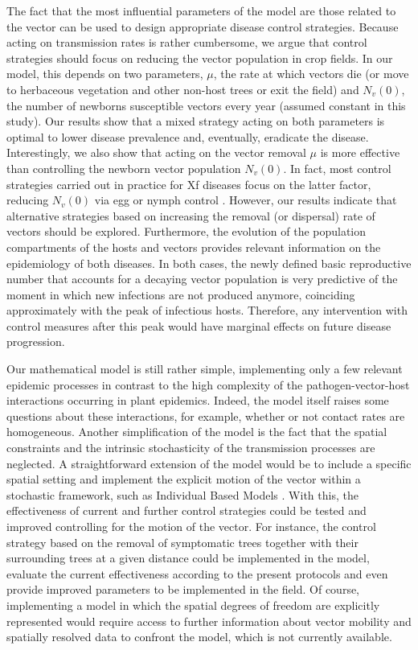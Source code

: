 The fact that the most influential parameters of the model are those
related to the vector can be used to design appropriate disease control
strategies. Because acting on transmission rates is rather cumbersome, we argue
that control strategies should focus on reducing the vector population in crop
fields. In our model, this depends on two parameters, $\mu$, the rate at which
vectors die (or move to herbaceous vegetation and other non-host trees or exit
the field) and $N_v(0)$, the number of newborns susceptible vectors every year
(assumed constant in this study). Our results show that a mixed strategy acting
on both parameters is optimal to lower disease prevalence and, eventually,
eradicate the disease. Interestingly, we also show that acting on the vector
removal $\mu$ is more effective than controlling the newborn vector population
$N_v(0)$. In fact, most control strategies carried out in practice for Xf
diseases focus on the latter factor, reducing $N_v(0)$ via egg or nymph control
\cite{Cornara2018, lopez2022mechanical, Lago2022}. However, our results
indicate that alternative strategies based on increasing the removal (or
dispersal) rate of vectors should be explored. Furthermore, the evolution of
the population compartments of the hosts and vectors provides relevant
information on the epidemiology of both diseases. In both cases, the newly
defined basic reproductive number that accounts for a decaying vector
population is very predictive of the moment in which new infections are not
produced anymore, coinciding approximately with the peak of infectious hosts.
Therefore, any intervention with control measures after this peak would have
marginal effects on future disease progression.

Our mathematical model is still rather simple, implementing only a few
relevant epidemic processes in contrast to the high complexity of the
pathogen-vector-host interactions occurring in plant epidemics. Indeed, the
model itself raises some questions about these interactions, for example,
whether or not contact rates are homogeneous. Another simplification of the
model is the fact that the spatial constraints and the intrinsic stochasticity
of the transmission processes are neglected. A straightforward extension of the
model would be to include a specific spatial setting and implement the explicit
motion of the vector within a stochastic framework, such as Individual Based
Models \cite{Grimm2005}. With this, the effectiveness of current and further
control strategies could be tested and improved controlling for the motion of
the vector. For instance, the control strategy based on the removal of
symptomatic trees together with their surrounding trees at a given distance
could be implemented in the model, evaluate the current effectiveness according
to the present protocols and even provide improved parameters to be implemented
in the field. Of course, implementing a model in which the spatial degrees of
freedom are explicitly represented would require access to further information
about vector mobility and spatially resolved data to confront the model, which
is not currently available.


